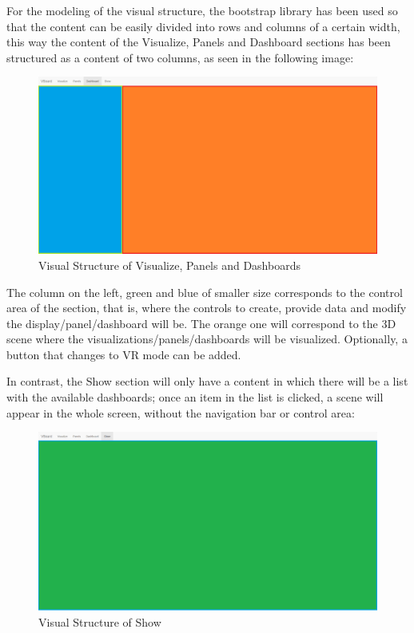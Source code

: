 \documentclass[a4paper, 12pt]{book}
\begin{document}
For the modeling of the visual structure, the bootstrap library has been used so that the content can be easily divided into rows and columns of a certain width, this way the content of the Visualize, Panels and Dashboard sections has been structured as a content of two columns, as seen in the following image:

\begin{figure}[H]
  \centering
  \includegraphics[width=16cm, keepaspectratio]{img/development/visualstructure}
  \caption{Visual Structure of Visualize, Panels and Dashboards}
  \label{fig:pluginhtml}
\end{figure}

The column on the left, green and blue of smaller size corresponds to the control area of the section, that is, where the controls to create, provide data and modify the display/panel/dashboard will be. The orange one will correspond to the 3D scene where the visualizations/panels/dashboards will be visualized. Optionally, a button that changes to VR mode can be added.

In contrast, the Show section will only have a content in which there will be a list with the available dashboards; once an item in the list is clicked, a scene will appear in the whole screen, without the navigation bar or control area:

\begin{figure}[H]
  \centering
  \includegraphics[width=16cm, keepaspectratio]{img/development/showstructure}
  \caption{Visual Structure of Show}
  \label{fig:pluginhtml}
\end{figure}
\end{document}
